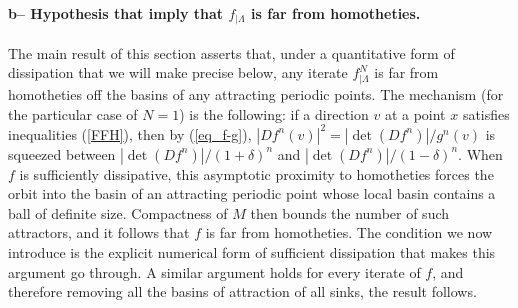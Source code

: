 \documentclass[a4paper,11pt]{article}
\theoremstyle{definition}
\def\La{\Lambda}
\def\de{\delta}
\def\La{\Lambda}
\begin{document}





\paragraph{b-- Hypothesis that imply that  $f_{|\La}$ is far from homotheties.}

The main result of this section asserts that, under a quantitative form of dissipation that we will make precise below, any iterate  $f^N_{|\La}$ is far from homotheties off the basins of any attracting periodic points.  The mechanism (for the particular case of $N=1$) is the following: if a direction $v$ at a point $x$ satisfies inequalities (\ref{FFH}), then by (\ref{eq_f-g}), $|Df^n(v)|^2= |\det(Df^n)|/g^n(v)$ is squeezed between $|\det(Df^n)|/(1+\de)^n$ and $|\det(Df^n)|/(1-\de)^n$. When $f$ is sufficiently dissipative, this asymptotic proximity to homotheties forces the orbit into the basin of an attracting periodic point whose local basin contains a ball of definite size. Compactness of $M$ then bounds the number of such attractors, and it  follows that $f$ is far from homotheties. The condition we now introduce is the explicit numerical form of sufficient dissipation that makes this argument go through. A similar argument holds for every iterate of $f$, and therefore removing all the basins of attraction of all sinks, the result follows.
\end{document}
